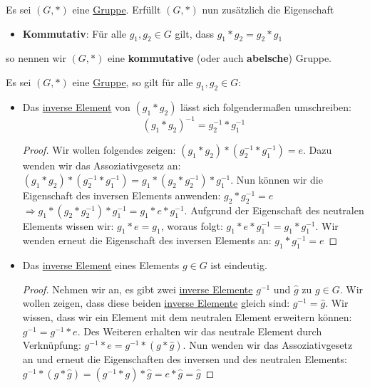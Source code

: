 \documentclass[../../main.tex]{subfiles}
\begin{document}
		\begin{definition}
			\label{def:kommutativ}
			\label{def:kommutativeGruppe}
			\label{def:abelscheGruppe}
			Es sei $(G,*)$ eine \hyperref[def:Gruppe]{Gruppe}. Erfüllt $(G,*)$ nun zusätzlich die Eigenschaft 
			\begin{itemize}
				\item \textbf{Kommutativ}: Für alle $g_1,g_2 \in G$ gilt, dass $g_1 * g_2 = g_2 * g_1$
			\end{itemize}
			so nennen wir $(G,*)$ eine \textbf{kommutative} (oder auch \textbf{abelsche}) Gruppe. 
		\end{definition}
	
		\begin{theorem}
			Es sei $(G,*)$ eine \hyperref[def:Gruppe]{Gruppe}, so gilt für alle $g_1,g_2\in G$:
			\begin{itemize}
				\item Das \hyperref[def:inversesElement]{inverse Element} von $(g_1*g_2)$ lässt sich folgendermaßen umschreiben:  $$(g_1*g_2)^{-1}=g_2^{-1}*g_1^{-1}$$
				\begin{proof}
					Wir wollen folgendes zeigen: $(g_1*g_2)*(g_2^{-1}*g_1^{-1})=e$. Dazu wenden wir das Assoziativgesetz an: $(g_1*g_2)*(g_2^{-1}*g_1^{-1})=g_1 * (g_2*g_2^{-1}) * g_1^{-1}$. Nun können wir die Eigenschaft des inversen Elements anwenden: $g_2*g_2^{-1}=e$ $\Rightarrow g_1 * (g_2*g_2^{-1}) * g_1^{-1} = g_1 * e * g_1^{-1}$. Aufgrund der Eigenschaft des neutralen Elements wissen wir: $g_1 * e = g_1$, woraus folgt: $g_1 * e * g_1^{-1} = g_1 * g_1^{-1}$. Wir wenden erneut die Eigenschaft des inversen Elements an: $g_1 * g_1^{-1} = e$
				\end{proof}
				\item Das \hyperref[def:inversesElement]{inverse Element} eines Elements $g \in G$ ist eindeutig.
				\begin{proof}
					Nehmen wir an, es gibt zwei \hyperref[def:inversesElement]{inverse Elemente} $g^{-1}$ und $\hat{g}$ zu $g \in G$. Wir wollen zeigen, dass diese beiden \hyperref[def:inversesElement]{inverse Elemente} gleich sind: $g^{-1} = \hat{g}$. Wir wissen, dass wir ein Element mit dem neutralen Element erweitern können: $g^{-1} = g^{-1} * e$. Des Weiteren erhalten wir das neutrale Element durch Verknüpfung: $g^{-1} * e = g^{-1} * (g * \hat{g})$. Nun wenden wir das Assoziativgesetz an und erneut die Eigenschaften des inversen und des neutralen Elements: $g^{-1} * (g * \hat{g}) = (g^{-1} * g) * \hat{g} = e * \hat{g} = \hat{g}$
				\end{proof}
			\end{itemize}
		\end{theorem}
	
\end{document}
